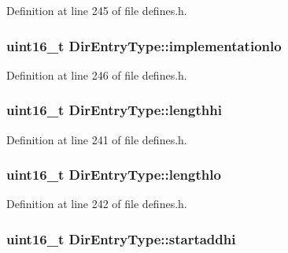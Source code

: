Definition at line 245 of file defines.\+h.

\subsubsection[{\texorpdfstring{implementationlo}{implementationlo}}]{\setlength{\rightskip}{0pt plus 5cm}uint16\+\_\+t Dir\+Entry\+Type\+::implementationlo}\hypertarget{structDirEntryType_a8164d577c06fb7c312aaa4955d491449}{}\label{structDirEntryType_a8164d577c06fb7c312aaa4955d491449}


Definition at line 246 of file defines.\+h.

\subsubsection[{\texorpdfstring{lengthhi}{lengthhi}}]{\setlength{\rightskip}{0pt plus 5cm}uint16\+\_\+t Dir\+Entry\+Type\+::lengthhi}\hypertarget{structDirEntryType_ad7aaba7b01038bc8bacb096bd66fff08}{}\label{structDirEntryType_ad7aaba7b01038bc8bacb096bd66fff08}


Definition at line 241 of file defines.\+h.

\subsubsection[{\texorpdfstring{lengthlo}{lengthlo}}]{\setlength{\rightskip}{0pt plus 5cm}uint16\+\_\+t Dir\+Entry\+Type\+::lengthlo}\hypertarget{structDirEntryType_ad1cde25a0229866557cd5983c27fbd31}{}\label{structDirEntryType_ad1cde25a0229866557cd5983c27fbd31}


Definition at line 242 of file defines.\+h.

\subsubsection[{\texorpdfstring{startaddhi}{startaddhi}}]{\setlength{\rightskip}{0pt plus 5cm}uint16\+\_\+t Dir\+Entry\+Type\+::startaddhi}\hypertarget{structDirEntryType_a0cab2915e9f864e25b24d298c36c11db}{}\label{structDirEntryType_a0cab2915e9f864e25b24d298c36c11db}



